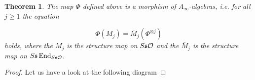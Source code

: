 \documentclass[twoside]{article}
\newtheorem{thm}[defin]{Theorem}
\begin{document}
\begin{thm}\label{theorem}
The map $\Phi$ defined above is a morphism of $A_\infty$-algebras, i.e. for all $j\geq 1$ the equation

\[\Phi(M_j)=\overline{M}_j(\Phi^{\otimes j})\]
holds, where the $M_j$ is the structure map on $S\mathfrak{s}{\mathcal O}$ and the $\overline{M}_j$ is the structure map on $S\mathfrak{s}\operatorname{End}_{S\mathfrak{s}{\mathcal O}}$.
\end{thm}
\begin{proof}
Let us have a look at the following diagram




\end{proof}
\end{document}
